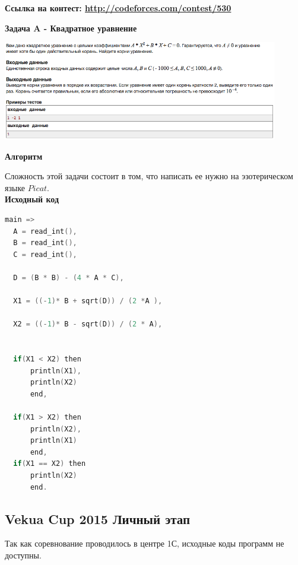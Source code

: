 \documentclass[a4paper,12pt]{article}
\begin{document}
\textbf{{\large Ссылка на контест: \url{http://codeforces.com/contest/530}}}

\newpage
\textbf{{\large Задача A - Квадратное уравнение}}

\begin{center}
\includegraphics[width=0.9\textwidth]{VK_1/VK_1_A.png}\\ [1cm]
\end{center}

\textbf{{\large Алгоритм}}

Сложность этой задачи состоит в том, что написать ее нужно на эзотерическом языке $Picat$.\\

\textbf{{\large Исходный код}} \\
\begin{lstlisting}[language=C]
 main =>
  A = read_int(),
  B = read_int(),
  C = read_int(),

  D = (B * B) - (4 * A * C),

  X1 = ((-1)* B + sqrt(D)) / (2 *A ),

  X2 = ((-1)* B - sqrt(D)) / (2 * A),


  if(X1 < X2) then
      println(X1),
      println(X2)
      end,

  if(X1 > X2) then
      println(X2),
      println(X1)
      end,
  if(X1 == X2) then
      println(X2)
      end.
\end{lstlisting}



%
%
\newpage
\subsection{Vekua Cup 2015 Личный этап}

Так как соревнование проводилось в центре 1С, исходные коды программ не доступны. \\
\end{document}
